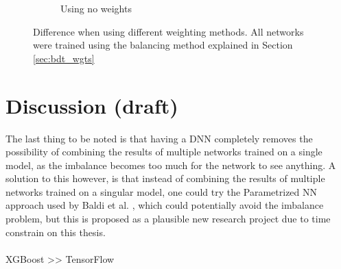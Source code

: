 \documentclass[12pt, a4paper]{book}
\begin{document}
\begin{figure}[!ht]
\begin{subfigure}[b]{0.49\textwidth}
      \caption{Using no weights}
   \end{subfigure}
   \caption[Difference when using different weighting methods on BDTs]{Difference when using different weighting methods. All networks were trained using the balancing method explained in Section \ref{sec:bdt_wgts}}\label{fig:BDT_wgts_sig}
\end{figure}

\clearpage

\section{Discussion (draft)}
The last thing to be noted is that having a DNN completely removes the possibility of combining the results of multiple networks trained on a single model, as the imbalance becomes too much for the network to see anything.
A solution to this however, is that instead of combining the results of multiple networks trained on a singular model, one could try the Parametrized NN approach used by Baldi et al. \cite{Baldi_2016}, which could potentially avoid the imbalance problem, but this is 
proposed as a plausible new research project due to time constrain on this thesis.\\
\\ XGBoost >> TensorFlow
\end{document}
